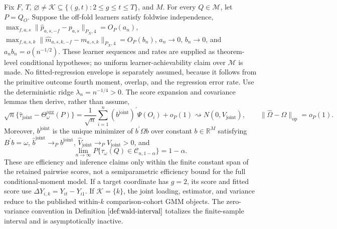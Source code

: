 Fix \(F\), \(T\), \(\varnothing\ne\mathcal K\subseteq\{(g,t):2\le g\le t\le T\}\), and \(M\). For every \(Q\in\mathcal M\), let \(P=Q_O\). Suppose the off-fold learners satisfy foldwise independence, \(\max_{f,a,s}\|\widehat p_{a,s,-f}-p_{a,s}\|_{P_X,4}=O_P(a_n)\), \(\max_{f,a,s,k}\|\widehat m_{a,s,k,-f}-m_{a,s,k}\|_{P_X,4}=O_P(b_n)\), \(a_n\to0\), \(b_n\to0\), and \(a_nb_n=o(n^{-1/2})\). These learner sequences and rates are supplied as theorem-level conditional hypotheses; no uniform learner-achievability claim over \(\mathcal M\) is made. No fitted-regression envelope is separately assumed, because it follows from the primitive outcome fourth moment, overlap, and the regression error rate. Use the deterministic ridge \(\lambda_n=n^{-1/4}>0\). The score expansion and covariance lemmas then derive, rather than assume, \[\sqrt n\{\widehat\tau_{\mathrm{joint}}-\Theta_\omega^{\mathrm{agg}}(P)\}=\frac{1}{\sqrt n}\sum_{i=1}^n(b^{\mathrm{joint}})^{\prime}\Psi(O_i)+o_P(1)\rightsquigarrow N(0,V_{\mathrm{joint}}),\qquad \|\widehat\Omega-\Omega\|_{\mathrm{op}}=o_P(1).\] Moreover, \(b^{\mathrm{joint}}\) is the unique minimizer of \(b^{\prime}\Omega b\) over constant \(b\in\mathbb R^M\) satisfying \(B^{\prime}b=\omega\), \(\widehat b^{\mathrm{joint}}\to_Pb^{\mathrm{joint}}\), \(\widehat V_{\mathrm{joint}}\to_PV_{\mathrm{joint}}>0\), and \[\lim_{n\to\infty}P\{\tau_\omega(Q)\in\mathcal C_{n,1-\alpha}\}=1-\alpha.\] These are efficiency and inference claims only within the finite constant span of the retained pairwise scores, not a semiparametric efficiency bound for the full conditional-moment model. If a target coordinate has \(g=2\), its score and fitted score use \(\Delta Y_{i,k}=Y_{it}-Y_{i1}\). If \(\mathcal K=\{k\}\), the joint loading, estimator, and variance reduce to the published within-\(k\) comparison-cohort GMM objects. The zero-variance convention in Definition \(\ref{def:wald-interval}\) totalizes the finite-sample interval and is asymptotically inactive.